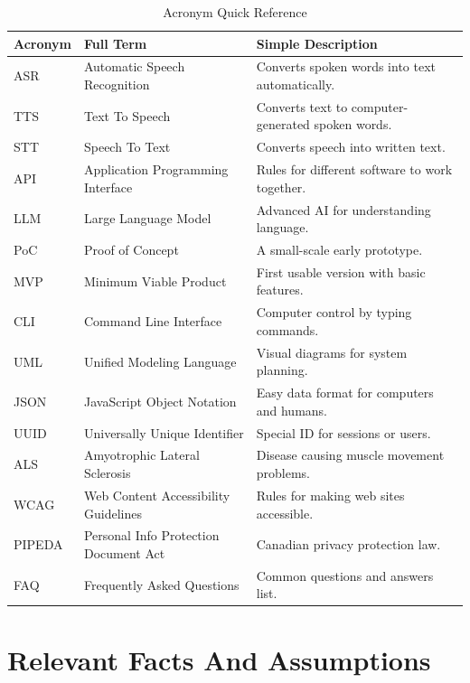 \documentclass[11pt]{article}
\begin{document}
\begin{table}[ht]
\centering
\begin{tabular}{|l|l|p{7cm}|}
\hline
\textbf{Acronym} & \textbf{Full Term} & \textbf{Simple Description} \\
\hline
ASR     & Automatic Speech Recognition           & Converts spoken words into text automatically. \\
TTS     & Text To Speech                        & Converts text to computer-generated spoken words. \\
STT     & Speech To Text                        & Converts speech into written text. \\
API     & Application Programming Interface      & Rules for different software to work together. \\
LLM     & Large Language Model                   & Advanced AI for understanding language. \\
PoC     & Proof of Concept                       & A small-scale early prototype. \\
MVP     & Minimum Viable Product                 & First usable version with basic features. \\
CLI     & Command Line Interface                 & Computer control by typing commands. \\
UML     & Unified Modeling Language              & Visual diagrams for system planning. \\
JSON    & JavaScript Object Notation             & Easy data format for computers and humans. \\
UUID    & Universally Unique Identifier          & Special ID for sessions or users. \\
ALS     & Amyotrophic Lateral Sclerosis          & Disease causing muscle movement problems. \\
WCAG    & Web Content Accessibility Guidelines   & Rules for making web sites accessible. \\
PIPEDA  & Personal Info Protection Document Act  & Canadian privacy protection law. \\
FAQ     & Frequently Asked Questions             & Common questions and answers list. \\
\hline
\end{tabular}
\caption{Acronym Quick Reference}
\end{table}

\section{Relevant Facts And Assumptions}
\end{document}
